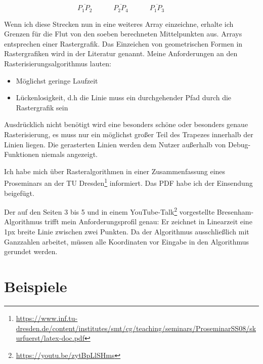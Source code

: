 	\begin{equation}
		\overline{P_1P_2} \hspace{3em}
		\overline{P_2P_4} \hspace{3em}
		\overline{P_1P_3} \hspace{3em}
	\end{equation}

	Wenn ich diese Strecken nun in eine weiteres Array einzeichne, erhalte ich Grenzen für die Flut von den soeben berechneten Mittelpunkten aus. Arrays entsprechen einer Rastergrafik. Das Einzeichen von geometrischen Formen in Rastergrafiken wird in der Literatur  genannt. Meine Anforderungen an den Rasterisierungsalgorithmus lauten:
	\begin{itemize}
		\item Möglichst geringe Laufzeit
		\item Lückenlosigkeit, d.h die Linie muss ein durchgehender Pfad durch die Rastergrafik sein
	\end{itemize}
	Ausdrücklich nicht benötigt wird eine besonders schöne oder besonders genaue Rasterisierung, es muss nur ein möglichst großer Teil des Trapezes innerhalb der Linien liegen. Die gerasterten Linien werden dem Nutzer außerhalb von Debug-Funktionen niemals angezeigt.

	Ich habe mich über Rasteralgorithmen in einer Zusammenfassung eines Proseminars an der TU Dresden\footnote{\url{https://www.inf.tu-dresden.de/content/institutes/smt/cg/teaching/seminars/ProseminarSS08/skurfuerst/latex-doc.pdf}} informiert. Das PDF habe ich der Einsendung beigefügt.
	
	Der auf den Seiten 3 bis 5 und in einem YouTube-Talk\footnote{\url{https://youtu.be/zytBpLlSHms}} vorgestellte Bresenham-Algorithmus trifft mein Anforderungsprofil genau: Er zeichnet in Linearzeit eine 1px breite Linie zwischen zwei Punkten. Da der Algorithmus ausschließlich mit Ganzzahlen arbeitet, müssen alle Koordinaten vor Eingabe in den Algorithmus gerundet werden.
\section{Beispiele}